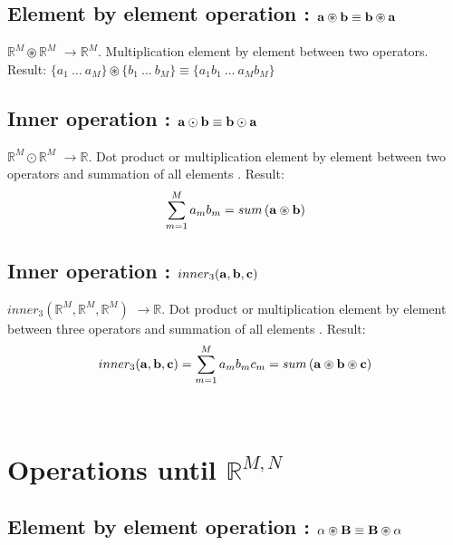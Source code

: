 \documentclass[11pt]{article}
\newcommand{\MATRIX}[1]{\mathbf{\uppercase{#1}}}
\newcommand{\VECTOR}[1]{\mathbf{\lowercase{#1}}}
\newcommand{\mulebe}{\circledast}
\newcommand{\mulinner}{\odot}
\newcommand{\dimsep}{,}
\newcommand{\funcmuliiinner}{inner_3 }
\begin{document}
\subsection{Element by element operation : $\VECTOR{a} \mulebe \VECTOR{b} \equiv \VECTOR{b} \mulebe \VECTOR{a}$}
  $\mathbb{R}^{M} \mulebe \mathbb{R}^{M}$ $\rightarrow \mathbb{R}^{M}$.  Multiplication element by element 
  between two operators. Result:
  $\{a_1~\hdots~a_{M} \}\mulebe \{b_1~\hdots~b_{M} \}\equiv \{a_1 b_1~\hdots~a_{M} b_{M} \}$
  
\subsection{Inner operation : $\VECTOR{a}\mulinner \VECTOR{b}\equiv \VECTOR{b}\mulinner \VECTOR{a}$}
 
  $\mathbb{R}^{M}\mulinner \mathbb{R}^{M}$ $\rightarrow \mathbb{R}$.  Dot product or multiplication element by element 
  between two operators and summation of all elements . 
  Result: 
  \begin{equation}
\sum \limits_{m=1}^{M} {a_m b_m}=sum\left( \VECTOR{a} \mulebe \VECTOR{b} \right)
  \end{equation}
  
\subsection{Inner operation : $\funcmuliiinner ( \VECTOR{a}, \VECTOR{b}, \VECTOR{c})$}
 
  $\funcmuliiinner( \mathbb{R}^{M}, \mathbb{R}^{M}, \mathbb{R}^{M})$ 
  $\rightarrow \mathbb{R}$.  Dot product or multiplication element by element 
  between three operators and summation of all elements . 
  Result: 
  \begin{equation}
\funcmuliiinner( \VECTOR{a}, \VECTOR{b}, \VECTOR{c})=
\sum \limits_{m=1}^{M} {a_m b_m c_m}=sum\left( \VECTOR{a} \mulebe \VECTOR{b}  \mulebe \VECTOR{c}\right)
  \end{equation}  

\newpage\
\section{Operations until $\mathbb{R}^{M \dimsep N}$}

\subsection{Element by element operation : $\alpha\mulebe  \MATRIX{B}\equiv \MATRIX{B}\mulebe \alpha$}
\end{document}
